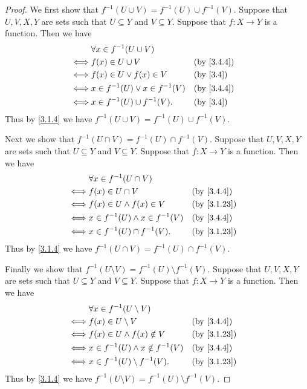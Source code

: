 \begin{proof}
  We first show that \(f^{-1}(U \cup V) = f^{-1}(U) \cup f^{-1}(V)\).
  Suppose that \(U, V, X, Y\) are sets such that \(U \subseteq Y\) and \(V \subseteq Y\).
  Suppose that \(f : X \to Y\) is a function.
  Then we have
  \begin{align*}
         & \forall x \in f^{-1}(U \cup V)                                   \\
    \iff & f(x) \in U \cup V                    &  & \by{3.4.4}             \\
    \iff & f(x) \in U \lor f(x) \in V           &  & \text{(by \cref{3.4})} \\
    \iff & x \in f^{-1}(U) \lor x \in f^{-1}(V) &  & \by{3.4.4}             \\
    \iff & x \in f^{-1}(U) \cup f^{-1}(V).      &  & \text{(by \cref{3.4})}
  \end{align*}
  Thus by \cref{3.1.4} we have \(f^{-1}(U \cup V) = f^{-1}(U) \cup f^{-1}(V)\).

  Next we show that \(f^{-1}(U \cap V) = f^{-1}(U) \cap f^{-1}(V)\).
  Suppose that \(U, V, X, Y\) are sets such that \(U \subseteq Y\) and \(V \subseteq Y\).
  Suppose that \(f : X \to Y\) is a function.
  Then we have
  \begin{align*}
         & \forall x \in f^{-1}(U \cap V)                                       \\
    \iff & f(x) \in U \cap V                     &  & \by{3.4.4}                \\
    \iff & f(x) \in U \land f(x) \in V           &  & \text{(by \cref{3.1.23})} \\
    \iff & x \in f^{-1}(U) \land x \in f^{-1}(V) &  & \by{3.4.4}                \\
    \iff & x \in f^{-1}(U) \cap f^{-1}(V).       &  & \text{(by \cref{3.1.23})}
  \end{align*}
  Thus by \cref{3.1.4} we have \(f^{-1}(U \cap V) = f^{-1}(U) \cap f^{-1}(V)\).

  Finally we show that \(f^{-1}(U \setminus V) = f^{-1}(U) \setminus f^{-1}(V)\).
  Suppose that \(U, V, X, Y\) are sets such that \(U \subseteq Y\) and \(V \subseteq Y\).
  Suppose that \(f : X \to Y\) is a function.
  Then we have
  \begin{align*}
         & \forall x \in f^{-1}(U \setminus V)                                     \\
    \iff & f(x) \in U \setminus V                   &  & \by{3.4.4}                \\
    \iff & f(x) \in U \land f(x) \notin V           &  & \text{(by \cref{3.1.23})} \\
    \iff & x \in f^{-1}(U) \land x \notin f^{-1}(V) &  & \by{3.4.4}                \\
    \iff & x \in f^{-1}(U) \setminus f^{-1}(V).     &  & \text{(by \cref{3.1.23})}
  \end{align*}
  Thus by \cref{3.1.4} we have \(f^{-1}(U \setminus V) = f^{-1}(U) \setminus f^{-1}(V)\).
\end{proof}

